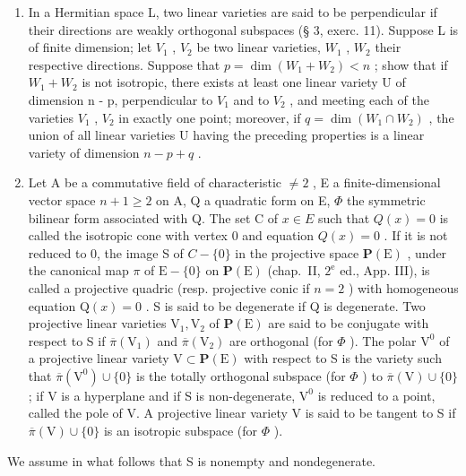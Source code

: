 \begin{enumerate}
\def\labelenumi{\arabic{enumi})}
\setcounter{enumi}{21}
\item
  In a Hermitian space L, two linear varieties are said to be perpendicular if their directions are weakly orthogonal subspaces (§ 3, exerc. 11). Suppose L is of finite dimension; let \(V_{1}\) , \(V_{2}\) be two linear varieties, \(W_{1}\) , \(W_{2}\) their respective directions. Suppose that \(p = \dim(W_{1} + W_{2}) < n\) ; show that if \(W_{1} + W_{2}\) is not isotropic, there exists at least one linear variety U of dimension n - p, perpendicular to \(V_{1}\) and to \(V_{2}\) , and meeting each of the varieties \(V_{1}\) , \(V_{2}\) in exactly one point; moreover, if \(q = \dim(W_{1} \cap W_{2})\) , the union of all linear varieties U having the preceding properties is a linear variety of dimension \(n - p + q\) .
\item
  Let A be a commutative field of characteristic \(\neq 2\) , E a finite-dimensional vector space \(n + 1 \geqslant 2\) on A, Q a quadratic form on E, \(\Phi\) the symmetric bilinear form associated with Q. The set C of \(x \in E\) such that \(Q(x) = 0\) is called the isotropic cone with vertex 0 and equation \(Q(x) = 0\) . If it is not reduced to 0, the image S of \(C - \{0\}\) in the projective space \(\mathbf{P}(\mathrm{E})\) , under the canonical map \(\pi\) of \(\mathrm{E}-\{0\}\) on \(\mathbf{P}(\mathrm{E})\) (chap.~II, \(2^{\mathrm{e}}\) ed., App. III), is called a projective quadric (resp. projective conic if \(n=2\) ) with homogeneous equation \(\mathrm{Q}(x)=0\) . S is said to be degenerate if Q is degenerate. Two projective linear varieties \(\mathrm{V}_{1}, \mathrm{V}_{2}\) of \(\mathbf{P}(\mathrm{E})\) are said to be conjugate with respect to S if \(\overline{\pi}(\mathrm{V}_{1})\) and \(\overline{\pi}(\mathrm{V}_{2})\) are orthogonal (for \(\Phi\) ). The polar \(\mathrm{V}^{0}\) of a projective linear variety \(\mathrm{V}\subset\mathbf{P}(\mathrm{E})\) with respect to S is the variety such that \(\overline{\pi}(\mathrm{V}^{0})\cup\{0\}\) is the totally orthogonal subspace (for \(\Phi\) ) to \(\overline{\pi}(\mathrm{V})\cup\{0\}\) ; if V is a hyperplane and if S is non-degenerate, \(\mathrm{V}^{0}\) is reduced to a point, called the pole of V. A projective linear variety V is said to be tangent to S if \(\overline{\pi}(\mathrm{V})\cup\{0\}\) is an isotropic subspace (for \(\Phi\) ).
\end{enumerate}

We assume in what follows that S is nonempty and nondegenerate.

